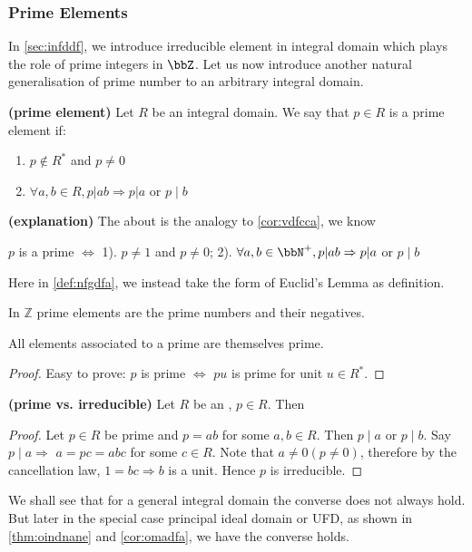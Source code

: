 \documentclass{article}
\newcommand{\bfs}[1]{\textbf{({#1}) }}
\begin{document}
\subsubsection{Prime Elements}
In \cref{sec:infddf}, we introduce irreducible element in integral domain which plays the role of prime integers in $\bbZ$. Let us now introduce another natural generalisation of prime number to an arbitrary integral domain.
\begin{defa}\bfs{prime element}\label{def:nfgdfa}
Let $R$ be an integral domain. We say that $p \in R$ is a prime element if:
\begin{enumerate}
    \item $p \notin R^{*}$ and $p \neq 0$
    \item $\forall a, b \in R, p|a b \Rightarrow p| a$ or $p \mid b$
\end{enumerate}
\end{defa}
\begin{rema}\bfs{explanation}
The about is the analogy to \cref{cor:vdfcca}, we know 

\centerline{$p$ is a prime $\Longleftrightarrow$ 1). $p \ne 1 $ and $p \neq 0$; 2). $\forall a, b \in \bbN^{+}, p|a b \Rightarrow p| a$ or $p \mid b$}

Here in \cref{def:nfgdfa}, we instead take the form of Euclid’s Lemma as definition.
\end{rema}
\begin{exma}
In $\mathbb{Z}$ prime elements are the prime numbers and their negatives.
\end{exma}
\begin{lema}
All elements associated to a prime are themselves prime.
\end{lema}
\begin{proof}
Easy to prove: $p$ is prime $\Longleftrightarrow$ $pu$ is prime for unit $u\in R^{*}$.
\end{proof}

\begin{thma}\bfs{prime vs. irreducible}\label{thm:bdfnmdf}
Let $R$ be an , $p \in R$. Then 

\centerline{}
\end{thma} 
\begin{proof}
Let $p \in R$ be prime and $p=a b$ for some $a, b \in R$. Then $p \mid a$ or $p \mid b$. Say $p \mid a \Rightarrow$ $a=p c=a b c$ for some $c \in R$. Note that $a \neq 0(p \neq 0)$, therefore by the cancellation law, $1=b c \Rightarrow b$ is a unit. Hence $p$ is irreducible.
\end{proof} 
\begin{rema}
We shall see that for a general integral domain the converse does not always hold.  But later in the special case principal ideal domain or UFD, as shown in \cref{thm:oindnane} and \cref{cor:omadfa}, we have the converse holds.
\end{rema}
\end{document}

